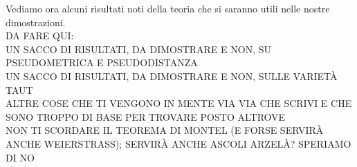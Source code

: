 Vediamo ora alcuni risultati noti della teoria che si saranno utili nelle nostre dimostrazioni. \\

DA FARE QUI:\\
UN SACCO DI RISULTATI, DA DIMOSTRARE E NON, SU PSEUDOMETRICA E PSEUDODISTANZA\\
UN SACCO DI RISULTATI, DA DIMOSTRARE E NON, SULLE VARIETÀ TAUT\\
ALTRE COSE CHE TI VENGONO IN MENTE VIA VIA CHE SCRIVI E CHE SONO TROPPO DI BASE PER TROVARE POSTO ALTROVE\\
NON TI SCORDARE IL TEOREMA DI MONTEL (E FORSE SERVIRÀ ANCHE WEIERSTRASS); SERVIRÀ ANCHE ASCOLI ARZELÀ? SPERIAMO DI NO